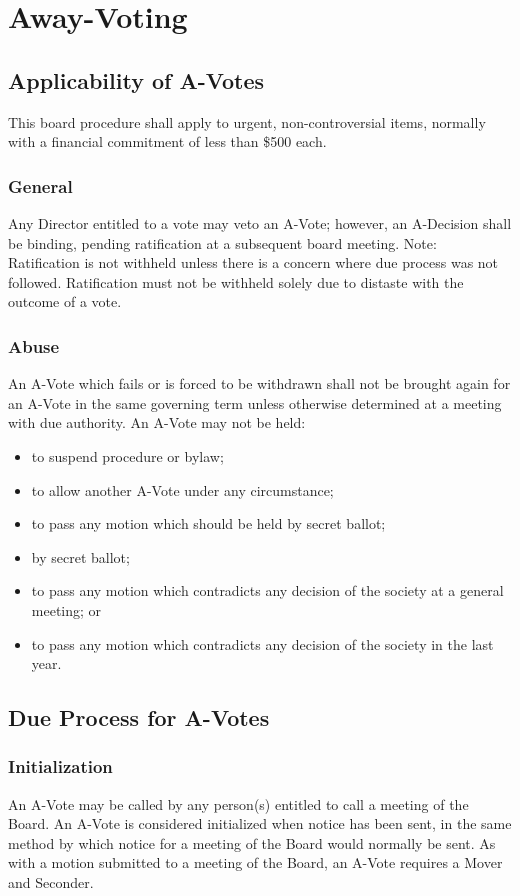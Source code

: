\section{Away-Voting}
\subsection{Applicability of A-Votes}
This board procedure shall apply to urgent, non-controversial items, normally with a financial commitment of less than \$500 each.

\subsubsection{General}
Any Director entitled to a vote may veto an A-Vote; however, an A-Decision shall be binding, pending ratification at a subsequent board meeting.
Note: Ratification is not withheld unless there is a concern where due process was not followed. 
Ratification must not be withheld solely due to distaste with the outcome of a vote.

\subsubsection{Abuse}
An A-Vote which fails or is forced to be withdrawn shall not be brought again for an A-Vote in the same governing term unless otherwise determined at a meeting with due authority.
An A-Vote may not be held:
\begin{itemize}
    \item  to suspend procedure or bylaw;
    \item  to allow another A-Vote under any circumstance;
    \item  to pass any motion which should be held by secret ballot;
    \item  by secret ballot;
    \item  to pass any motion which contradicts any decision of the society at a general meeting; or
    \item  to pass any motion which contradicts any decision of the society in the last year.
\end{itemize}

\subsection{Due Process for A-Votes}
\subsubsection{Initialization}
An A-Vote may be called by any person(s) entitled to call a meeting of the Board.
An A-Vote is considered initialized when notice has been sent, in the same method by which notice for a meeting of the Board would normally be sent.
As with a motion submitted to a meeting of the Board, an A-Vote requires a Mover and Seconder.

